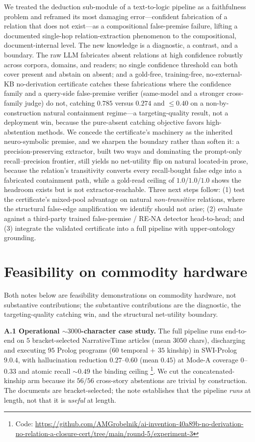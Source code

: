 \documentclass[11pt,letterpaper]{article}
\begin{document}
We treated the deduction sub-module of a text-to-logic pipeline as a faithfulness problem and reframed its most damaging error---confident fabrication of a relation that does not exist---as a compositional false-premise failure, lifting a documented single-hop relation-extraction phenomenon to the compositional, document-internal level. The new knowledge is a diagnostic, a contrast, and a boundary. The raw LLM fabricates absent relations at high confidence robustly across corpora, domains, and readers; no single confidence threshold can both cover present and abstain on absent; and a gold-free, training-free, no-external-KB no-derivation certificate catches these fabrications where the confidence family and a query-side false-premise verifier (same-model and a stronger cross-family judge) do not, catching $0.785$ versus $0.274$ and $\leq 0.40$ on a non-by-construction natural containment regime---a targeting-quality result, not a deployment win, because the pure-absent catching objective favors high-abstention methods. We concede the certificate's machinery as the inherited neuro-symbolic premise, and we sharpen the boundary rather than soften it: a precision-preserving extractor, built two ways and dominating the prompt-only recall--precision frontier, still yields no net-utility flip on natural located-in prose, because the relation's transitivity converts every recall-bought false edge into a fabricated containment path, while a gold-read ceiling of $1.0/1.0/1.0$ shows the headroom exists but is not extractor-reachable. Three next steps follow: (1) test the certificate's mixed-pool advantage on natural \emph{non-transitive} relations, where the structural false-edge amplification we identify should not arise; (2) evaluate against a third-party trained false-premise / RE-NA detector head-to-head; and (3) integrate the validated certificate into a full pipeline with upper-ontology grounding.

\appendix

\section{Feasibility on commodity hardware}
\label{sec:feasibility}

Both notes below are feasibility demonstrations on commodity hardware, not substantive contributions; the substantive contributions are the diagnostic, the targeting-quality catching win, and the structural net-utility boundary.

\textbf{A.1 Operational ${\sim}3000$-character case study.} The full pipeline runs end-to-end on $5$ bracket-selected NarrativeTime articles (mean $3050$ chars), discharging and executing $95$ Prolog programs ($60$ temporal $+$ $35$ kinship) in SWI-Prolog $9.0.4$, with hallucination reduction $0.27$--$0.60$ (mean $0.45$) at Mode-A coverage $0$--$0.33$ and atomic recall ${\sim}0.49$ the binding ceiling \footnote{Code: \url{https://github.com/AMGrobelnik/ai-invention-40a89b-no-derivation-no-relation-a-closure-cert/tree/main/round-5/experiment-3}}. We cut the concatenated-kinship arm because its $56/56$ cross-story abstentions are trivial by construction. The documents are bracket-selected; the note establishes that the pipeline \emph{runs} at length, not that it is \emph{useful} at length.
\end{document}
